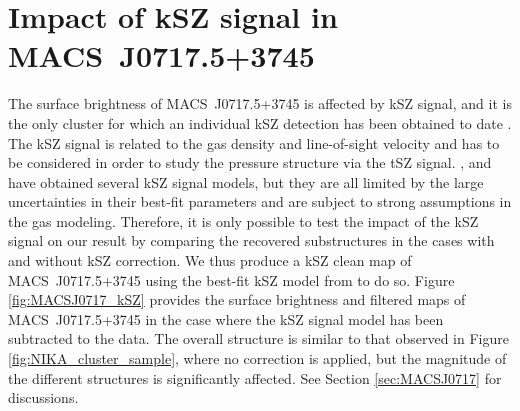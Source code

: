 \documentclass[traditabstract]{aa}
\begin{document}
\begin{figure}[h]
\label{fig:transfer_function_effect}
\end{figure}

\section{Impact of kSZ signal in \mbox{MACS~J0717.5+3745}}\label{sec:Impact_of_kSZ}
The surface brightness of \mbox{MACS~J0717.5+3745} is affected by kSZ signal, and it is the only cluster for which an individual kSZ detection has been obtained to date \citep[][]{Mroczkowski2012,Sayers2013,Adam2016b}. The kSZ signal is related to the gas density and line-of-sight velocity and has to be considered in order to study the pressure structure via the tSZ signal. \cite{Mroczkowski2012}, \cite{Sayers2013} and \cite{Adam2016b} have obtained several kSZ signal models, but they are all limited by the large uncertainties in their best-fit parameters and are subject to strong assumptions in the gas modeling. Therefore, it is only possible to test the impact of the kSZ signal on our result by comparing the recovered substructures in the cases with and without kSZ correction. We thus produce a kSZ clean map of \mbox{MACS~J0717.5+3745} using the best-fit kSZ model from \cite{Adam2016b} to do so. Figure \ref{fig:MACSJ0717_kSZ} provides the surface brightness and filtered maps of \mbox{MACS~J0717.5+3745} in the case where the kSZ signal model has been subtracted to the data. The overall structure is similar to that observed in Figure \ref{fig:NIKA_cluster_sample}, where no correction is applied, but the magnitude of the different structures is significantly affected. See Section \ref{sec:MACSJ0717} for discussions.
\end{document}
